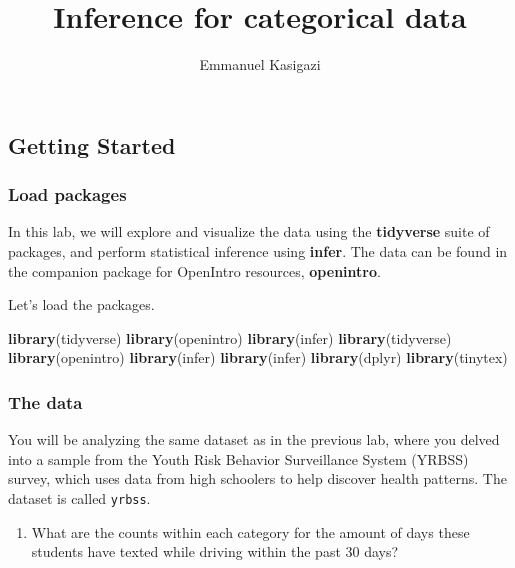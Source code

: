 \documentclass[
]{article}
\title{Inference for categorical data}
\author{Emmanuel Kasigazi}
\date{}
\newenvironment{Shaded}{\begin{snugshade}}{\end{snugshade}}
\newcommand{\FunctionTok}[1]{\textcolor[rgb]{0.13,0.29,0.53}{\textbf{#1}}}
\newcommand{\NormalTok}[1]{#1}
\providecommand{\tightlist}{%
  \setlength{\itemsep}{0pt}\setlength{\parskip}{0pt}}
\begin{document}
\maketitle

\subsection{Getting Started}\label{getting-started}

\subsubsection{Load packages}\label{load-packages}

In this lab, we will explore and visualize the data using the
\textbf{tidyverse} suite of packages, and perform statistical inference
using \textbf{infer}. The data can be found in the companion package for
OpenIntro resources, \textbf{openintro}.

Let's load the packages.

\begin{Shaded}
\begin{Highlighting}[]
\FunctionTok{library}\NormalTok{(tidyverse)}
\FunctionTok{library}\NormalTok{(openintro)}
\FunctionTok{library}\NormalTok{(infer)}
\FunctionTok{library}\NormalTok{(tidyverse)}
\FunctionTok{library}\NormalTok{(openintro)}
\FunctionTok{library}\NormalTok{(infer)}
\FunctionTok{library}\NormalTok{(infer)}
\FunctionTok{library}\NormalTok{(dplyr)}
\FunctionTok{library}\NormalTok{(tinytex)}
\end{Highlighting}
\end{Shaded}

\subsubsection{The data}\label{the-data}

You will be analyzing the same dataset as in the previous lab, where you
delved into a sample from the Youth Risk Behavior Surveillance System
(YRBSS) survey, which uses data from high schoolers to help discover
health patterns. The dataset is called \texttt{yrbss}.

\begin{enumerate}
\def\labelenumi{\arabic{enumi}.}
\tightlist
\item
  What are the counts within each category for the amount of days these
  students have texted while driving within the past 30 days?
\end{enumerate}
\end{document}
